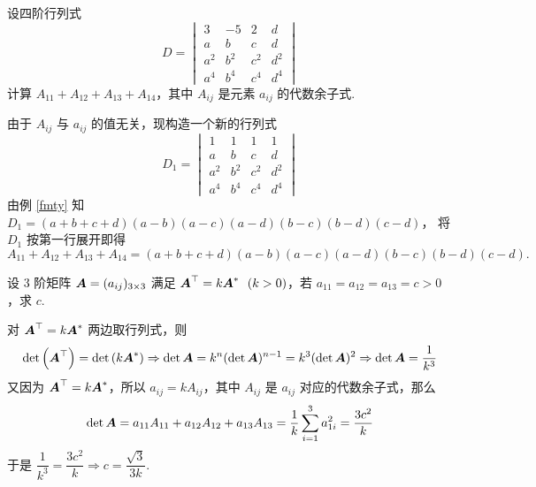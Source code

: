 \begin{example}[2010 云南大学]
    设四阶行列式
    $$D=\begin{vmatrix}
            3   & -5  & 2   & d   \\
            a   & b   & c   & d   \\
            a^2 & b^2 & c^2 & d^2 \\
            a^4 & b^4 & c^4 & d^4
        \end{vmatrix}$$
    计算 $A_{11}+A_{12}+A_{13}+A_{14}$，其中 $A_{ij}$ 是元素 $a_{ij}$ 的代数余子式.
\end{example}
\begin{solution}
    由于 $A_{ij}$ 与 $a_{ij}$ 的值无关，现构造一个新的行列式
    $$D_1=\begin{vmatrix}
            1   & 1   & 1   & 1   \\
            a   & b   & c   & d   \\
            a^2 & b^2 & c^2 & d^2 \\
            a^4 & b^4 & c^4 & d^4
        \end{vmatrix}$$
        由例 \ref{fmty} 知 $D_1=(a+b+c+d)(a-b)(a-c)(a-d)(b-c)(b-d)(c-d)$，
        将 $D_1$ 按第一行展开即得 
        $$A_{11}+A_{12}+A_{13}+A_{14}=(a+b+c+d)(a-b)(a-c)(a-d)(b-c)(b-d)(c-d).$$
\end{solution}

\begin{example}
    设 3 阶矩阵 $\vb*{A}=(a_{ij})_{3\times 3}$ 满足 $\vb*{A}^\top=k\vb*{A}^*~~(k>0)$，若 $a_{11}=a_{12}=a_{13}=c>0$，求 $c.$
\end{example}
\begin{solution}
    对 $\vb*{A}^\top=k\vb*{A}^*$ 两边取行列式，则 $$\det\qty(\vb*{A}^\top)=\det\qty(k\vb*{A}^*)\Rightarrow \det\vb*{A}=k^n(\det\vb*{A})^{n-1}=k^3(\det\vb*{A})^2\Rightarrow \det\vb*{A}=\dfrac{1}{k^3}$$
    又因为 $\vb*{A}^\top=k\vb*{A}^*$，所以 $a_{ij}=kA_{ij}$，其中 $A_{ij}$ 是 $a_{ij}$ 对应的代数余子式，那么 $$\det\vb*{A}=a_{11}A_{11}+a_{12}A_{12}+a_{13}A_{13}=\dfrac{1}{k}\sum_{i=1}^{3}a_{1i}^2=\dfrac{3c^2}{k}$$
    于是 $\dfrac{1}{k^3}=\dfrac{3c^2}{k}\Rightarrow c=\dfrac{\sqrt{3}}{3k}.$
\end{solution}
